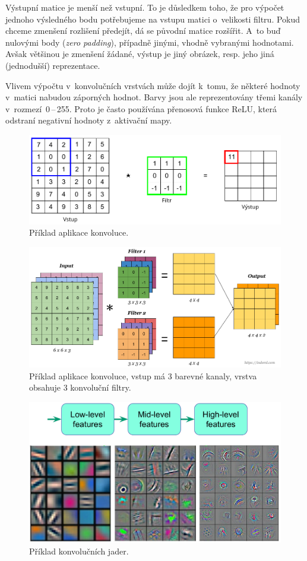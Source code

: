 \begin{compactitem}
    \item Výstupní matice je menší než vstupní. To je důsledkem toho, že pro výpočet jednoho výsledného bodu potřebujeme na vstupu matici o~velikosti filtru. Pokud chceme zmenšení rozlišení předejít, dá se původní matice rozšířit. A~to buď nulovými body (\textit{zero padding}), případně jinými, vhodně vybranými hodnotami. Avšak většinou je zmenšení žádané, výstup je jiný obrázek, resp. jeho jiná (jednodušší) reprezentace.

    \item Vlivem výpočtu v~konvolučních vrstvách může dojít k~tomu, že některé hodnoty v~matici nabudou záporných hodnot. Barvy jsou ale reprezentovány třemi kanály v~rozmezí~0\,--\,255. Proto je často používána přenosová funkce ReLU, která odstraní negativní hodnoty z~aktivační mapy.
\end{compactitem}

\begin{figure}[H]
    \centering
    \includegraphics[width=0.8\linewidth]{convolution.pdf}
    \caption{Příklad aplikace konvoluce.}
\end{figure}

\begin{figure}[H]
    \centering
    \includegraphics[width=1\linewidth]{conv.png}
    \caption{Příklad aplikace konvoluce, vstup má 3 barevné kanaly, vrstva obsahuje 3 konvoluční filtry.}
\end{figure}

\begin{figure}[H]
    \centering
    \includegraphics[width=0.75\linewidth]{conv-kernel.pdf}
    \caption{Příklad konvolučních jader.}
\end{figure}

